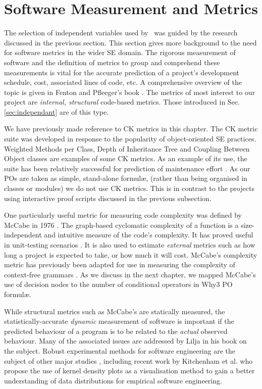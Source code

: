 \section{Software Measurement and Metrics}
\label{sec:lrmm}

The selection of independent variables used by \where~was guided by the research discussed in the previous section. 
This section gives more background to the need for software metrics in the wider SE domain.
The rigorous measurement of software and the definition of metrics to group and comprehend these measurements is vital for the accurate prediction of a project's development schedule, cost, associated lines of code, etc. 
A comprehensive overview of the topic is given in Fenton and Pfleeger's book \cite{FentonPfleeger}. 
The metrics of most interest to our project are \textit{internal, structural} code-based metrics. 
Those introduced in Sec. \ref{sec:independant} are of this type.

We have previously made reference to CK metrics in this chapter. 
The CK metric suite was developed in response to the popularity of object-oriented SE practices. 
Weighted Methods per Class, Depth of Inheritance Tree and Coupling Between Object classes are examples of some CK metrics. 
As an example of its use, the suite has been relatively successful for prediction of maintenance effort \cite{LiHenry}. 
As our POs are taken as simple, stand-alone formul\ae, (rather than being organised in classes or modules) we do not use CK metrics. 
This is in contrast to the projects using interactive proof scripts discussed in the previous subsection. 

One particularly useful metric for measuring code complexity was defined by McCabe in 1976 \cite{McCabe}. The graph-based cyclomatic complexity of a function is a size-independent and intuitive measure of the code's complexity. It has proved useful in unit-testing scenarios \cite{McCabeTesting}. It is also used to estimate \textit{external} metrics such as how long a project is expected to take, or how much it will cost.  McCabe's complexity metric has previously been adapted for use in measuring the complexity of context-free grammars \cite{nuimeprn6458}. As we discuss in the next chapter, we mapped McCabe's use of decision nodes to the number of conditional operators in \textsf{Why3} PO formul\ae.

While structural metrics such as McCabe's are statically measured, the statistically-accurate \textit{dynamic} measurement of software is important if the predicted behaviour of a program is to be related to the \textit{actual} observed behaviour. Many of the associated issues are addressed by Lilja \cite{LiljaJ} in his book on the subject. Robust experimental methods for software engineering are the subject of other major studies \cite{AdvancedESE}, including recent work by Kitchenham et al. \cite{Kitchenham2016} who propose the use of kernel density plots as a visualisation method to gain a better understanding of data distributions for empirical software engineering.

